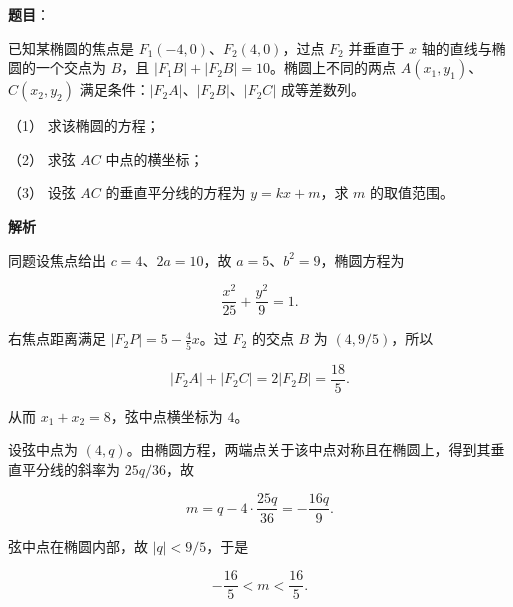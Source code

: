 \begin{answer}

\textbf{题目}：

已知某椭圆的焦点是 $F_1(-4,0)$、$F_2(4,0)$，过点 $F_2$ 并垂直于 $x$ 轴的直线与椭圆的一个交点为 $B$，且 $|F_1B|+|F_2B|=10$。椭圆上不同的两点 $A(x_1,y_1)$、$C(x_2,y_2)$ 满足条件：$|F_2A|\text{、}|F_2B|\text{、}|F_2C|$ 成等差数列。

（1） 求该椭圆的方程；

（2） 求弦 $AC$ 中点的横坐标；

（3） 设弦 $AC$ 的垂直平分线的方程为 $y=kx+m$，求 $m$ 的取值范围。

\textbf{解析}


同题设焦点给出 $c=4$、$2a=10$，故 $a=5$、$b^2=9$，椭圆方程为

\nopagebreak[4]
\[
\frac{x^2}{25}+\frac{y^2}{9}=1.
\]


右焦点距离满足 $|F_2P|=5-\frac45x$。过 $F_2$ 的交点 $B$ 为 $(4,9/5)$，所以

\nopagebreak[4]
\[
|F_2A|+|F_2C|=2|F_2B|=\frac{18}{5}.
\]

从而 $x_1+x_2=8$，弦中点横坐标为 $4$。


设弦中点为 $(4,q)$。由椭圆方程，两端点关于该中点对称且在椭圆上，得到其垂直平分线的斜率为 $25q/36$，故

\nopagebreak[4]
\[
m=q-4\cdot\frac{25q}{36}=-\frac{16q}{9}.
\]

弦中点在椭圆内部，故 $|q|<9/5$，于是

\nopagebreak[4]
\[
-\frac{16}{5}<m<\frac{16}{5}.
\]




\end{answer}